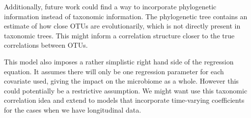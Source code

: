 \documentclass[12pt]{article}
\begin{document}
Additionally, future work could find a way to incorporate phylogenetic information instead of taxonomic information. The phylogenetic tree contains an estimate of how close OTUs are evolutionarily, which is not directly present in taxonomic trees. This might inform a correlation structure closer to the true correlations between OTUs.

This model also imposes a rather simplistic right hand side of the regression equation. It assumes there will only be one regression parameter for each covariate used, giving the impact on the microbiome as a whole. However this could potentially be a restrictive assumption. We might want use this taxonomic correlation idea and extend to models that incorporate time-varying coefficients for the cases when we have longitudinal data.










\begin{singlespace}
\printbibliography
\end{singlespace}
\end{document}
